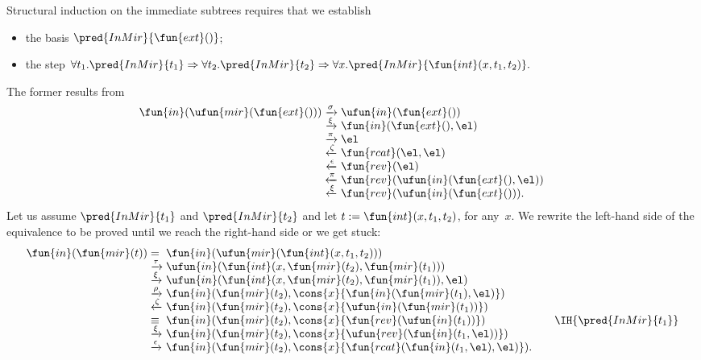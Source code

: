 \noindent Structural induction on the immediate subtrees requires that
we establish
\begin{itemize}

  \item the basis
  \(\pred{InMir}{\fun{ext}()}\);

  \item the step \(\forall t_1.\pred{InMir}{t_1} \Rightarrow \forall
    t_2.\pred{InMir}{t_2} \Rightarrow \forall
    x.\pred{InMir}{\fun{int}(x,t_1,t_2)}.\)

\end{itemize}
The former results from
\begin{equation*}
\begin{array}{@{}r@{\;}c@{\;}l@{\qquad}}
  \fun{in}(\ufun{mir}(\fun{ext}()))
  & \xrightarrow{\smash{\sigma}}
  & \ufun{in}(\fun{ext}())\\
  & \xrightarrow{\smash{\xi}}
  & \fun{in}(\fun{ext}(),\el)\\
  & \xrightarrow{\smash{\pi}}
  & \el\\
  & \xleftarrow{\smash{\zeta}}
  & \fun{rcat}(\el,\el)\\
  & \xleftarrow{\smash{\epsilon}}
  & \fun{rev}(\el)\\
  & \xleftarrow{\smash{\pi}}
  & \fun{rev}(\ufun{in}(\fun{ext}(),\el))\\
  & \xleftarrow{\smash{\xi}}
  & \fun{rev}(\ufun{in}(\fun{ext}())).
  \index{rcat@\fun{rcat/2}}\index{rev@\fun{rev/1}}
\end{array}
\end{equation*}
Let us assume \(\pred{InMir}{t_1}\) and \(\pred{InMir}{t_2}\) and let
\(t := \fun{int}(x,t_1,t_2)\), for any~\(x\). We rewrite the
left\hyp{}hand side of the equivalence to be proved until we reach the
right\hyp{}hand side or we get stuck:
\begin{equation*}
\begin{array}{@{}r@{\;}l@{\;}l@{\qquad}r@{}}
\fun{in}(\fun{mir}(t)) & = &
\fun{in}(\ufun{mir}(\fun{int}(x,t_1,t_2)))\\
& \xrightarrow{\smash{\tau}}
& \ufun{in}(\fun{int}(x,\fun{mir}(t_2),\fun{mir}(t_1)))\\
& \xrightarrow{\smash{\xi}}
& \ufun{in}(\fun{int}(x,\fun{mir}(t_2),\fun{mir}(t_1)),\el)\\
& \xrightarrow{\smash{\rho}}
& \fun{in}(\fun{mir}(t_2),\cons{x}{\fun{in}(\fun{mir}(t_1),\el)})\\
& \xleftarrow{\smash{\zeta}}
& \fun{in}(\fun{mir}(t_2),\cons{x}{\ufun{in}(\fun{mir}(t_1))})\\
& \equiv
& \fun{in}(\fun{mir}(t_2),\cons{x}{\fun{rev}(\ufun{in}(t_1))})
& \IH{\pred{InMir}{t_1}}\\
& \xrightarrow{\smash{\xi}}
& \fun{in}(\fun{mir}(t_2),\cons{x}{\ufun{rev}(\fun{in}(t_1,\el))})\\
& \xrightarrow{\smash{\epsilon}}
& \fun{in}(\fun{mir}(t_2),\cons{x}{\fun{rcat}(\fun{in}(t_1,\el),\el)}).
\end{array}
\end{equation*}
